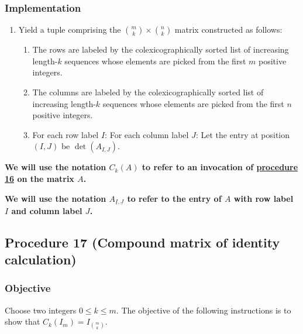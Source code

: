 \documentclass[twocolumn]{article}
\newcommand{\ul}[1]{\underline{#1}}
\begin{document}
			\subsubsection{Implementation}
				\begin{enumerate}
					\item Yield a tuple comprising the $\binom{m}{k}\times\binom{n}{k}$ matrix constructed as follows:
					\begin{enumerate}
						\item The rows are labeled by the colexicographically sorted list of increasing length-$k$ sequences whose elements are picked from the first $m$ positive integers.
						\item The columns are labeled by the colexicographically sorted list of increasing length-$k$ sequences whose elements are picked from the first $n$ positive integers.
						\item For each row label $I$: For each column label $J$: Let the entry at position $(I,J)$ be $\det(A_{I,J})$.
					\end{enumerate}
				\end{enumerate}
			\textbf{We will use the notation $C_k(A)$ to refer to an invocation of \hyperref[sec:procedure 16]{procedure 16} on the matrix $A$.}
			
			\textbf{We will use the notation $A_{\ul{I},\ul{J}}$ to refer to the entry of $A$ with row label $I$ and column label $J$.}
		\subsection{Procedure 17 (Compound matrix of identity calculation)}\label{sec:procedure 17}
			\subsubsection{Objective}
				Choose two integers $0\le k\le m$. The objective of the following instructions is to show that $C_k(I_m)=I_{\binom{m}{k}}$.
\end{document}
